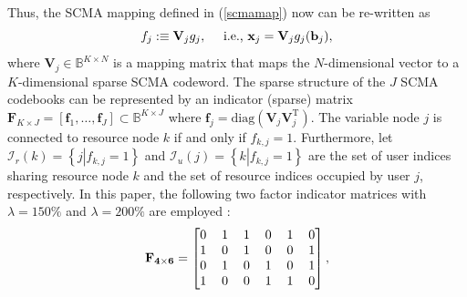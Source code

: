 \documentclass[journal]{IEEEtran}
\begin{document}
Thus, the SCMA mapping defined in (\ref{scmamap}) now can be re-written as 
\begin{equation} 
 \small
\label{scmaMapping}
f_{j}:\equiv \mathbf {V}_{j}g_{j}, \quad {~\text {i.e., }}\mathbf {x}_{j}=\mathbf {V}_{j}g_{j}(\mathbf {b}_{j}),
\end{equation}
where $\mathbf {V}_{j} \in \mathbb {B}^{K \times N} $ is a  mapping   matrix that maps the $N$-dimensional vector  to a $K$-dimensional sparse SCMA codeword. The sparse structure of the $J$ SCMA codebooks can be represented by an  indicator (sparse) matrix  $\mathbf {F}_{K \times J} = \left [ \mathbf {f}_1, \ldots, \mathbf {f}_J \right] \subset \mathbb {B}^{K\times J}$ where  $\mathbf {f}_j = \text {diag}(\mathbf {V}_j\mathbf {V}_j^{\text{T}})$.  The %
variable node  $j$ is connected to   resource node  $k$ if and only if $f_{k,j}=1$.   Furthermore, let  $ \boldsymbol{\boldsymbol{\mathcal {I}}}_r(k)=
\left\{ {j\left| {{f_{k,j}} = 1} \right.} \right\}$ and $\boldsymbol{\boldsymbol{\mathcal {I}}}_u(j)=\left\{ {k\left| {{f_{k,j}} =1} \right.} \right\}$ are  the set of user indices sharing resource node $k$ and the set of resource indices occupied  by user $j$, respectively.  
In this paper, the following two factor indicator matrices with $\lambda = 150\%$ and $\lambda = 200\%$ are employed \cite{mheich2018design,li2020design}:
\begin{equation} \label{factor_46}
 \small
\setlength{\arraycolsep}{1pt}
\begin{aligned} \mathbf {F_{4 \times 6}}=\left [{ 
\begin{matrix} 
0 &\quad 1 &\quad 1 &\quad 0 &\quad 1 &\quad 0 \\ 
1 &\quad 0 &\quad 1 &\quad 0 &\quad 0 &\quad 1 \\ 
0 &\quad 1 &\quad 0 &\quad 1 &\quad 0 &\quad 1 \\ 
1 &\quad 0 &\quad 0 &\quad 1 &\quad 1 &\quad 0 \\ 
\end{matrix} }\right],
\end{aligned}
\end{equation}
\end{document}
